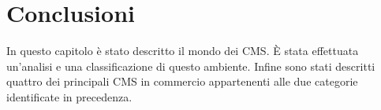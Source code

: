 \section{Conclusioni}
\label{cms_concl}
In questo capitolo è stato descritto il mondo dei CMS. È stata effettuata un'analisi e una classificazione di questo ambiente. Infine sono stati descritti quattro dei principali CMS in commercio appartenenti alle due categorie identificate in precedenza.